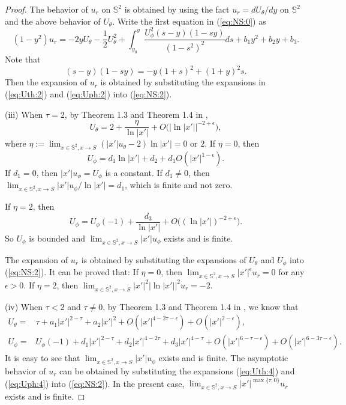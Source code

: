 \documentclass[12pt]{article}
\newcommand{\bS}{\mathbb{S}}
\begin{document}
\begin{proof}
	The behavior of $u_r$ on $\mathbb{S}^2$ is obtained by using the fact $u_r=dU_{\theta}/dy$ on $\bS^2$ and the above behavior of $U_{\theta}$. Write the first equation in (\ref{eq:NS:0}) as 
	\begin{equation}\label{eq:NS:2}
		(1-y^2)u_r = - 2 y U_\theta - \frac{1}{2} U_\theta^2 + \int_{y_0}^{y} \frac{U_{\phi}^2 (s-y) (1-sy) }{ (1-s^2)^2 } ds + b_1 y^2 + b_2 y + b_3.
	\end{equation}
	Note that 
	\[
		(s-y)(1-sy) = - y (1+s)^2 + (1+y)^2 s. 
	\]
	Then the expansion of $u_r$ is obtained by substituting the expansions in (\ref{eq:Uth:2}) and (\ref{eq:Uph:2}) into (\ref{eq:NS:2}). 
	
	(iii) When $\tau=2$, by Theorem 1.3 and Theorem 1.4 in \cite{LLY1}, 
	\[
		U_\theta = 2 + \frac{\eta}{\ln|x'|} + O\big( | \ln |x'||^{-2+\epsilon} \big), 
	\]
	where $
		\eta:= \lim_{x\in \mathbb{S}^2, x\to S} (|x'|u_\theta-2) \ln |x'|=0\textrm{ or 2}$. 
	If $\eta=0$, then \[
		U_\phi = d_1 \ln |x'| + d_2 + d_1 O(|x'|^{1-\epsilon}). 
	\]
	If $d_1=0$, then $ |x'| u_\phi=U_\phi$ is a constant. If $d_1\not=0$, then $\lim_{x\in\mathbb{S}^2,x\to S} |x'| u_\phi / \ln |x'|=d_1$, which is finite and not zero. 

	If $\eta=2$, then 
	\[
		U_\phi = U_\phi(-1) + \frac{d_3}{\ln |x'|} + O\big( (\ln |x'|)^{-2+\epsilon} \big).
	\]
	So $U_\phi$ is bounded and $\lim_{x\in\mathbb{S}^2,x\to S}|x'|u_\phi$ exists and is finite. 
	
	The expansion of $u_r$ is obtained by substituting the expansions of $U_\theta$ and $U_\phi$ into (\ref{eq:NS:2}). It can be proved that: If $\eta=0$, then $\lim_{x\in\mathbb{S}^2,x\to S} |x'|^{\epsilon} u_r = 0$ for any $\epsilon>0$. If $\eta=2$, then $\lim_{x\in\mathbb{S}^2,x\to S} |x'|^2 \big| \ln |x'| \big|^2 u_r = -2$. 
	
	(iv) When $\tau<2$ and $\tau\not=0$, by Theorem 1.3 and Theorem 1.4 in \cite{LLY1}, we know that 
	\begin{align}
		U_\theta = & \tau + a_1 |x'|^{2-\tau} + a_2 |x'|^2 + O(|x'|^{4-2\tau-\epsilon}) + O(|x'|^{2-\epsilon}), \label{eq:Uth:4} \\
		U_\phi = & U_\phi(-1) + d_1 |x'|^{2-\tau} + d_2 |x'|^{4-2\tau} + d_3 |x'|^{4-\tau} + O(|x'|^{6-\tau-\epsilon}) + O(|x'|^{6-3\tau-\epsilon}). \label{eq:Uph:4}
	\end{align}
	It is easy to see that $\lim_{x\in\mathbb{S}^2,x\to S} |x'|u_\phi$ exists and is finite. The asymptotic behavior of $u_r$ can be obtained by substituting the expansions (\ref{eq:Uth:4}) and (\ref{eq:Uph:4}) into (\ref{eq:NS:2}). In the present case, $\lim_{x\in\mathbb{S}^2,x\to S} |x'|^{\max\{\tau,0\}} u_r$ exists and is finite.
	

\end{proof}
\end{document}
